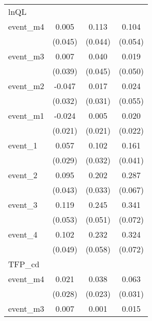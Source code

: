 \begin{table}[htbp]
\begin{tabular}{l*{3}{c}}
lnQL        &                     &                     &                     \\
event\_m4    &       0.005         &       0.113\sym{*}  &       0.104         \\
            &     (0.045)         &     (0.044)         &     (0.054)         \\
[1em]
event\_m3    &       0.007         &       0.040         &       0.019         \\
            &     (0.039)         &     (0.045)         &     (0.050)         \\
[1em]
event\_m2    &      -0.047         &       0.017         &       0.024         \\
            &     (0.032)         &     (0.031)         &     (0.055)         \\
[1em]
event\_m1    &      -0.024         &       0.005         &       0.020         \\
            &     (0.021)         &     (0.021)         &     (0.022)         \\
[1em]
event\_1     &       0.057\sym{*}  &       0.102\sym{**} &       0.161\sym{***}\\
            &     (0.029)         &     (0.032)         &     (0.041)         \\
[1em]
event\_2     &       0.095\sym{*}  &       0.202\sym{***}&       0.287\sym{***}\\
            &     (0.043)         &     (0.033)         &     (0.067)         \\
[1em]
event\_3     &       0.119\sym{*}  &       0.245\sym{***}&       0.341\sym{***}\\
            &     (0.053)         &     (0.051)         &     (0.072)         \\
[1em]
event\_4     &       0.102\sym{*}  &       0.232\sym{***}&       0.324\sym{***}\\
            &     (0.049)         &     (0.058)         &     (0.072)         \\
\hline
TFP\_cd      &                     &                     &                     \\
event\_m4    &       0.021         &       0.038         &       0.063\sym{*}  \\
            &     (0.028)         &     (0.023)         &     (0.031)         \\
[1em]
event\_m3    &       0.007         &       0.001         &       0.015         \\

\end{tabular}
\end{table}
